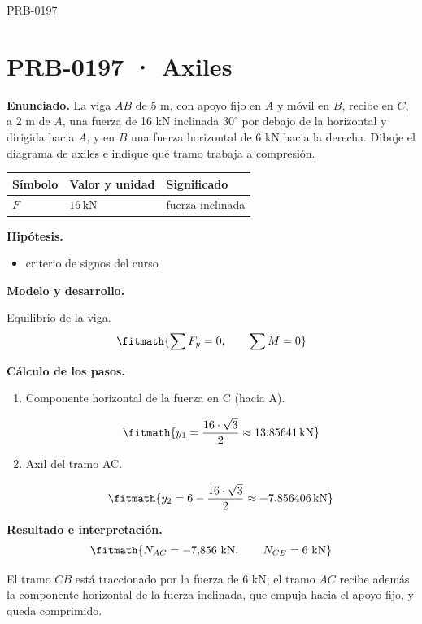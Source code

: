 \begin{studiumworked}{PRB-0197}

\section{PRB-0197 · Axiles}

\textbf{Enunciado.} La viga $AB$ de 5 m, con apoyo fijo en $A$ y móvil en $B$, recibe en $C$, a 2 m de $A$, una fuerza de 16 kN inclinada $30^{\circ}$ por debajo de la horizontal y dirigida hacia $A$, y en $B$ una fuerza horizontal de 6 kN hacia la derecha. Dibuje el diagrama de axiles e indique qué tramo trabaja a compresión.

\par\medskip\noindent\begin{tabular}{@{}p{.18\linewidth}p{.26\linewidth}p{.48\linewidth}@{}}
\toprule Símbolo & Valor y unidad & Significado\\\midrule
$F$ & $16\,\mathrm{kN}$ & fuerza inclinada\\
\bottomrule\end{tabular}\par\medskip

\textbf{Hipótesis.}\begin{itemize}\item criterio de signos del curso\end{itemize}

\textbf{Modelo y desarrollo.}

Equilibrio de la viga.\[\fitmath{\sum F_y = 0,\qquad \sum M = 0}\]

\textbf{Cálculo de los pasos.}

\begin{enumerate}

\item Componente horizontal de la fuerza en C (hacia A).

\[\fitmath{y_{1}=\frac{16\cdot \sqrt{3}}{2}\approx 13.85641\,\mathrm{kN}}\]

\item Axil del tramo AC.

\[\fitmath{y_{2}=6-\frac{16\cdot \sqrt{3}}{2}\approx -7.856406\,\mathrm{kN}}\]

\end{enumerate}

\textbf{Resultado e interpretación.}\[\fitmath{N_{AC} = -7{,}856\ \mathrm{kN},\qquad N_{CB} = 6\ \mathrm{kN}}\]

El tramo $CB$ está traccionado por la fuerza de $6$ kN; el tramo $AC$ recibe además la componente horizontal de la fuerza inclinada, que empuja hacia el apoyo fijo, y queda comprimido.


\end{studiumworked}
